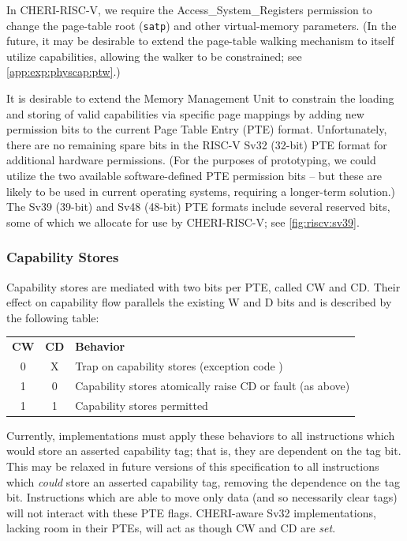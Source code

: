 In CHERI-RISC-V, we require the Access\_System\_Registers permission to change
the page-table root (\texttt{satp}) and other virtual-memory parameters.
(In the future, it may be desirable to extend the page-table walking mechanism
to itself utilize capabilities, allowing the walker to be constrained;
see \cref{app:exp:physcap:ptw}.)

It is desirable to extend the Memory Management Unit
to constrain the loading and storing of valid capabilities via specific page
mappings by adding new permission bits to the current Page Table Entry
(PTE) format.
%
Unfortunately, there are no remaining spare bits in the RISC-V Sv32 (32-bit)
PTE format for additional hardware permissions.
(For the purposes of prototyping, we could utilize the two
available software-defined PTE permission bits -- but these are likely to be
used in current operating systems, requiring a longer-term solution.)
%
The Sv39 (39-bit) and Sv48 (48-bit) PTE formats include several reserved bits,
some of which we allocate for use by CHERI-RISC-V; see \cref{fig:riscv:sv39}.

\subsubsection{Capability Stores}

Capability stores are mediated with two bits per PTE, called CW and CD.  Their
effect on capability flow parallels the existing W and D bits and is described
by the following table:

\begin{center}
%
\begin{tabular}{ccl}

\textbf{CW} & \textbf{CD} & \textbf{Behavior} \\
0 & X & Trap on capability stores (exception code \riscvstorecappagefault{}) \\
1 & 0 & Capability stores atomically raise CD or fault (as above) \\
1 & 1 & Capability stores permitted
\end{tabular}
%
\end{center}

\noindent Currently, implementations must apply these behaviors to all
instructions which would store an asserted capability tag; that is, they are
dependent on the tag bit. This may be relaxed in future versions of this
specification to all instructions which \emph{could} store an asserted
capability tag, removing the dependence on the tag bit. Instructions which are
able to move only data (and so necessarily clear tags) will not interact with
these PTE flags. CHERI-aware Sv32 implementations, lacking room in their PTEs,
will act as though CW and CD are \emph{set}.

